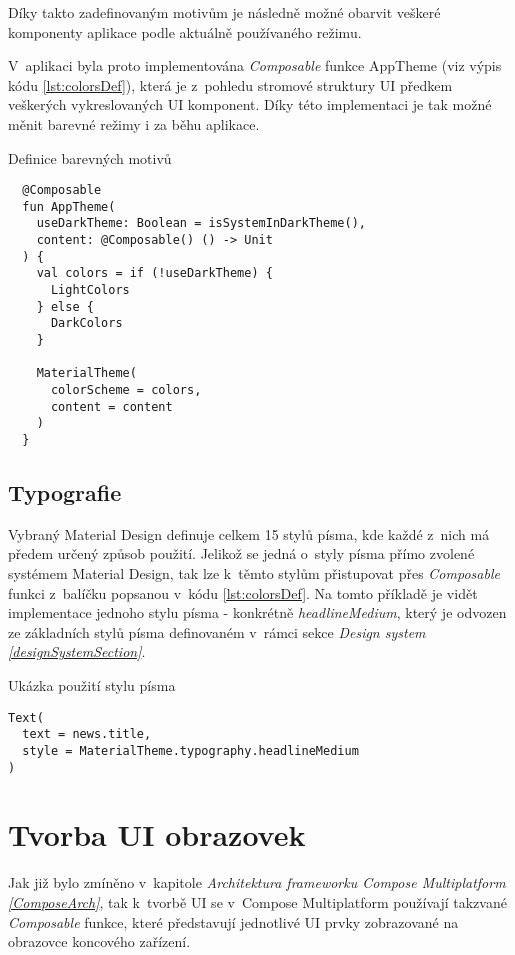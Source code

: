 Díky takto zadefinovaným motivům je následně možné obarvit veškeré komponenty aplikace podle aktuálně používaného režimu.

V~aplikaci byla proto implementována \textit{Composable} funkce AppTheme (viz výpis kódu \ref{lst:colorsDef}), která je z~pohledu stromové struktury
UI předkem veškerých vykreslovaných UI komponent. Díky této implementaci je tak možné měnit barevné režimy i za běhu aplikace. 
\begin{listing}[H]
\caption{Definice barevných motivů}\label{lst:colorsDef}
\begin{verbatim}
  @Composable
  fun AppTheme(
    useDarkTheme: Boolean = isSystemInDarkTheme(),
    content: @Composable() () -> Unit
  ) {
    val colors = if (!useDarkTheme) {
      LightColors
    } else {
      DarkColors
    }
  
    MaterialTheme(
      colorScheme = colors,
      content = content
    )
  }
\end{verbatim}
\end{listing}


\subsection*{Typografie}
Vybraný Material Design definuje celkem 15 stylů písma, kde každé z~nich má předem určený způsob použití. \cite{material3} 
Jelikož se jedná o~styly písma přímo zvolené systémem Material Design, tak lze k~těmto stylům přistupovat přes
\textit{Composable} funkci  z~balíčku  popsanou v~kódu \ref{lst:colorsDef}.
Na tomto příkladě je vidět implementace jednoho stylu písma - konkrétně \textit{headlineMedium}, který je odvozen ze základních stylů písma 
definovaném v~rámci sekce \textit{Design system \ref{designSystemSection}}.

\begin{listing}[H]
\caption{Ukázka použití stylu písma}\label{lst:typographyExample}
\begin{verbatim}
Text(
  text = news.title,
  style = MaterialTheme.typography.headlineMedium
)
\end{verbatim}
\end{listing}

\section{Tvorba UI obrazovek}
Jak již bylo zmíněno v~kapitole \textit{Architektura frameworku Compose Multiplatform \ref{ComposeArch}}, tak k~tvorbě UI se v~Compose Multiplatform 
používají takzvané \textit{Composable} funkce, které představují jednotlivé UI prvky zobrazované na obrazovce koncového zařízení. 

